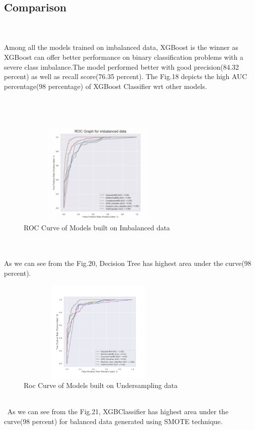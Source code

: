 \documentclass[a4paper, 10pt, conference]{ieeeconf}      %
\begin{document}
\subsection{\textbf{Comparison}}
\\\
\\
Among all the models trained on imbalanced data, XGBoost is the winner as XGBoost can offer better performance on binary classification problems with a severe class imbalance.The model performed better with good precision(84.32 percent) as well as recall score(76.35 percent). The Fig.18 depicts the high AUC percentage(98 percentage) of XGBoost Classifier wrt other models. 
\\\
\\\
\\\
\begin{figure}[htp]
    \centering
    \includegraphics[width=8cm,height=5cm]{Images/Roc_without_sampling_final.png}
    \caption{ROC Curve of Models built on Imbalanced data}
    \label{fig:Roc Curve of Models built on Imbalanced data}
\end{figure}
\\\
\\As we can see from the Fig.20, Decision Tree has highest area under the curve(98 percent).

\begin{figure}[htp]
    \centering
    \includegraphics[width=8cm,height=5cm]{Images/Roc_with_undersampling_final.png}
    \caption{Roc Curve of Models built on Undersampling data}
    \label{fig:Roc Curve of Models built on Undersampling data}
\end{figure}
\\\
As we can see from the Fig.21, XGBClassifier has highest area under the curve(98 percent) for balanced data generated using SMOTE technique.
\end{document}
